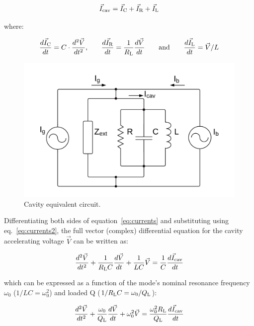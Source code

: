 \documentclass[a4paper,12pt]{article}
\begin{document}
\begin{equation}
  \centering \vec I_{\rm cav} = \vec I_{\rm C} + \vec I_{\rm R} + \vec I_{\rm L}
  \label{eq:currents}
\end{equation}

where:

\begin{equation}
  \frac{d\vec I_{\rm C}}{dt} = C \cdot \frac{d^2\vec V}{dt^2}\text{,}\qquad \frac{d\vec I_{\rm R}}{dt} = \frac{1}{R_{\rm L}}\frac{d\vec V}{dt} \qquad \text{and}\qquad \frac{d\vec I_{\rm L}}{dt} = \vec V/L
  \label{eq:currents2}
\end{equation}

\begin{figure}
\centering
\includegraphics[scale=0.25]{../figures/cavity_eq_circuit.png}
\caption{Cavity equivalent circuit.}
\label{fig:cav_eq_circuit}
\end{figure}

Differentiating both sides of equation~\ref{eq:currents} and substituting using eq.~\ref{eq:currents2}, the full vector (complex) differential equation for the cavity accelerating voltage $\vec V$ can be written as:

\begin{equation}
  \frac{d^2\vec V}{dt^2} + \frac{1}{R_{\rm L}C}\frac{d\vec V}{dt} + \frac{1}{LC}\vec V = \frac{1}{C}\frac{d\vec I_{\rm cav}}{dt}
\end{equation}

which can be expressed as a function of the mode's nominal resonance frequency $\omega_0$ ($1/LC=\omega_0^2$) and loaded Q ($1/R_{\rm L}C=\omega_0/Q_{\rm L}$):
 
\begin{equation}
  \frac{d^2\vec V}{dt^2} + \frac{\omega_0}{Q_{\rm L}}\frac{d\vec V}{dt} + \omega_0^2 \vec V = \frac{\omega_0^2 R_{\rm L}}{Q_{\rm L}}\frac{d\vec I_{\rm cav}}{dt}
  \label{eq:2nd_order}
\end{equation}
\end{document}
